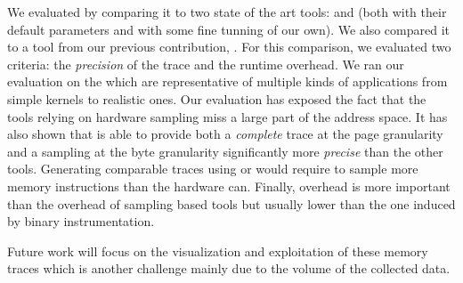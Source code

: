 We evaluated \Moca by comparing it to two state of the art tools: \Mitos and
\MemProf (both with their default parameters and with some fine tunning of our own). We also compared it to a
tool from our previous contribution, \TABARNAC. For this comparison, we evaluated
two criteria: the \emph{precision} of the trace and the runtime overhead. We ran our
evaluation on the \NPB which are representative of multiple kinds of applications from simple kernels
to realistic ones. Our evaluation has exposed the fact that the tools
relying on hardware sampling miss a large part of the address space. It
has also shown that \Moca is able to provide both a \emph{complete} trace at the page
granularity and a sampling at the byte granularity significantly more \emph{precise} than the
other tools. Generating comparable traces using \MemProf or \Mitos would
require to sample more memory instructions than the hardware can.
Finally, \Moca overhead is more important than the overhead of sampling
based tools but usually lower than the one induced by binary instrumentation.

Future work will focus on the visualization and exploitation of these memory traces
which is another challenge mainly due to the volume of the collected data.
